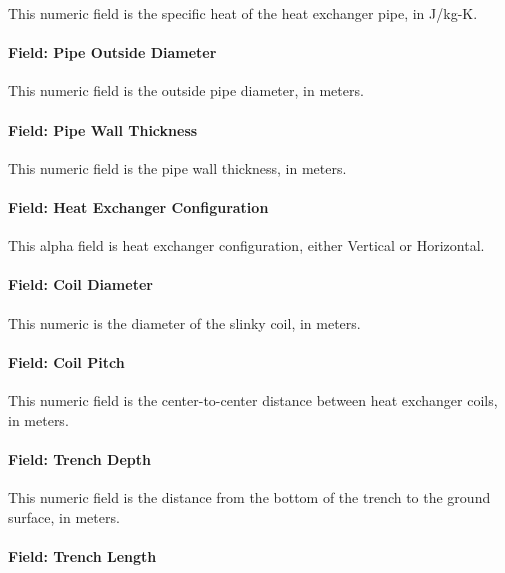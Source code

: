 This numeric field is the specific heat of the heat exchanger pipe, in J/kg-K.

\paragraph{Field: Pipe Outside Diameter}\label{field-pipe-outside-diameter}

This numeric field is the outside pipe diameter, in meters.

\paragraph{Field: Pipe Wall Thickness}\label{field-pipe-wall-thickness}

This numeric field is the pipe wall thickness, in meters.

\paragraph{Field: Heat Exchanger Configuration}\label{field-heat-exchanger-configuration}

This alpha field is heat exchanger configuration, either Vertical or Horizontal.

\paragraph{Field: Coil Diameter}\label{field-coil-diameter}

This numeric is the diameter of the slinky coil, in meters.

\paragraph{Field: Coil Pitch}\label{field-coil-pitch}

This numeric field is the center-to-center distance between heat exchanger coils, in meters.

\paragraph{Field: Trench Depth}\label{field-trench-depth}

This numeric field is the distance from the bottom of the trench to the ground surface, in meters.

\paragraph{Field: Trench Length}\label{field-trench-length}

